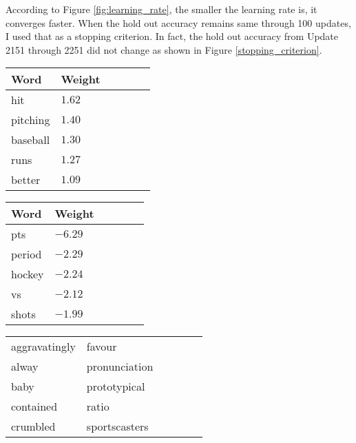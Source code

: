 \documentclass[11pt]{article}
\begin{document}
According to Figure \ref{fig:learning_rate}, the smaller the learning rate is, it converges faster. 
When the hold out accuracy remains same through 100 updates, I used that as a stopping criterion. In fact, the hold out accuracy from Update 2151 through 2251 did not change as shown in Figure \ref{stopping_criterion}.

\begin{table*}[h]
 \begin{minipage}{.33\linewidth}
  \centering
  \begin{tabular}{|l|l|r|r|r|r|}
  \hline \bf Word     & \bf Weight     \\ \hline
  hit      & $1.62$ \\
  pitching & $1.40$ \\
  baseball & $1.30$ \\
  runs     & $1.27$ \\
  better   & $1.09$  \\
  \hline
  \end{tabular}
 \caption{\label{positive_class} The top $5$ weighted words for the baseball class. }
 \end{minipage}
 \begin{minipage}{.33\linewidth}
  \centering
  \begin{tabular}{|l|l|r|r|r|r|}
  \hline \bf Word     & \bf Weight     \\ \hline
  pts      & $-6.29$ \\
  period   & $-2.29$ \\
  hockey   & $-2.24$ \\
  vs       & $-2.12$ \\
  shots    & $-1.99$ \\
  \hline
  \end{tabular}
 \caption{\label{negative_class} The top $5$ weighted words for the hockey class. }
 \end{minipage}
 \begin{minipage}{.33\linewidth}
  \centering
  \begin{tabular}{|l|l|r|r|r|r|}
  \hline 
  aggravatingly       & favour         \\
  alway               & pronunciation  \\
  baby                & prototypical   \\
  contained           & ratio          \\
  crumbled            & sportscasters  \\
  \hline
  \end{tabular}
 \caption{\label{neutral_class} List of words with $0$ weights. }
 \end{minipage}

\end{table*}
\end{document}
